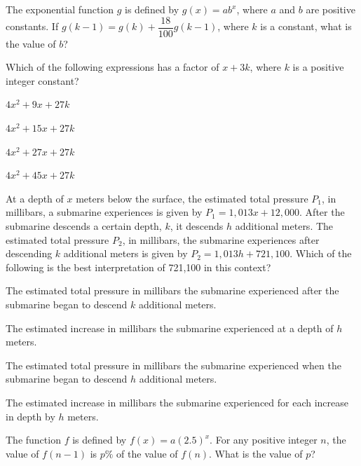 \vfill
\noindent\begin{minipage}{\linewidth}
\par\smallskip
The exponential function $g$ is defined by $g(x)=ab^x$, where $a$ and $b$ are positive constants. If $g(k-1)=g(k)+\dfrac{18}{100}g(k-1)$, where $k$ is a constant, what is the value of $b$?
\end{minipage}
\vfill
\clearpage
\noindent\begin{minipage}{\linewidth}
\par\smallskip
Which of the following expressions has a factor of $x+3k$, where $k$ is a positive integer constant?
\begin{satchoices}
  \item[A)] $4x^2+9x+27k$
  \item[B)] $4x^2+15x+27k$
  \item[C)] $4x^2+27x+27k$
  \item[D)] $4x^2+45x+27k$
\end{satchoices}
\end{minipage}
\vfill
\noindent\begin{minipage}{\linewidth}
\par\smallskip
At a depth of $x$ meters below the surface, the estimated total pressure $P_1$, in millibars, a submarine experiences is given by $P_1=1{,}013x+12{,}000$. After the submarine descends a certain depth, $k$, it descends $h$ additional meters. The estimated total pressure $P_2$, in millibars, the submarine experiences after descending $k$ additional meters is given by $P_2=1{,}013h+721{,}100$. Which of the following is the best interpretation of 721,100 in this context?
\begin{satchoices}
  \item[A)] The estimated total pressure in millibars the submarine experienced after the submarine began to descend $k$ additional meters.
  \item[B)] The estimated increase in millibars the submarine experienced at a depth of $h$ meters.
  \item[C)] The estimated total pressure in millibars the submarine experienced when the submarine began to descend $h$ additional meters.
  \item[D)] The estimated increase in millibars the submarine experienced for each increase in depth by $h$ meters.
\end{satchoices}
\end{minipage}
\vfill
\noindent\begin{minipage}{\linewidth}
\par\smallskip
The function $f$ is defined by $f(x)=a(2.5)^x$. For any positive integer $n$, the value of $f(n-1)$ is $p\%$ of the value of $f(n)$. What is the value of $p$?
\end{minipage}
